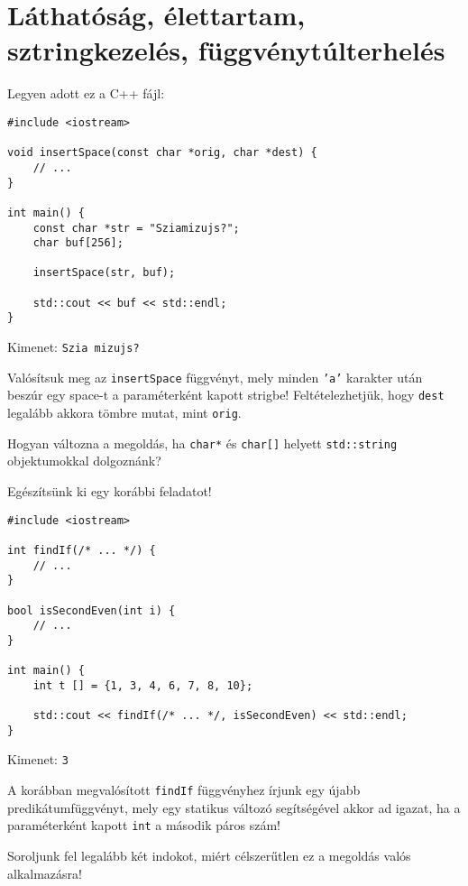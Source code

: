 \documentclass[../exercise_book/exercise_book.tex]{subfiles}
\begin{document}
	\section{Láthatóság, élettartam, sztringkezelés, függvénytúlterhelés}
	
	\begin{exercise}
		Legyen adott ez a C++ fájl:
		
		\smallskip
		\begin{lstlisting}
#include <iostream>

void insertSpace(const char *orig, char *dest) {
	// ...
}

int main() {
	const char *str = "Sziamizujs?";
	char buf[256];
	
	insertSpace(str, buf);
	
	std::cout << buf << std::endl;
}
		\end{lstlisting}
		Kimenet: \texttt{Szia mizujs?}
		
		\smallskip
		Valósítsuk meg az \texttt{insertSpace} függvényt, mely minden \texttt{'a'} karakter után beszúr egy space-t a paraméterként kapott strigbe! Feltételezhetjük, hogy \texttt{dest} legalább akkora tömbre mutat, mint \texttt{orig}.
		
		\medskip
		Hogyan változna a megoldás, ha \texttt{char*} és \texttt{char[]} helyett \texttt{std::string} objektumokkal dolgoznánk?
	\end{exercise}
	\begin{exercise}
		Egészítsünk ki egy korábbi feladatot!
		
		\smallskip
		\fbox{\textbf{03\_01static\_main.cpp}}
		\begin{lstlisting}
#include <iostream>

int findIf(/* ... */) {
	// ...
}

bool isSecondEven(int i) {
	// ...
}

int main() {
	int t [] = {1, 3, 4, 6, 7, 8, 10};
	
	std::cout << findIf(/* ... */, isSecondEven) << std::endl;
}
		\end{lstlisting}
		Kimenet: \texttt{3}
		
		\smallskip
		A korábban megvalósított \texttt{findIf} függvényhez írjunk egy újabb predikátumfüggvényt, mely egy statikus változó segítségével akkor ad igazat, ha a paraméterként kapott \texttt{int} a második páros szám! 
		
		\medskip
		Soroljunk fel legalább két indokot, miért célszerűtlen ez a megoldás valós alkalmazásra!
	\end{exercise}
\end{document}
